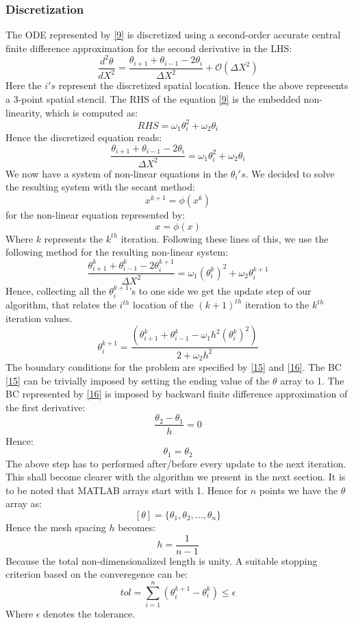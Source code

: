 \documentclass[12pt]{article}
\begin{document}
\subsubsection{Discretization}
The ODE represented by \eqref{9} is discretized using a second-order accurate central finite difference approximation for the second derivative in the LHS: 
\[
\frac{d^2\theta}{dX^2} = \frac{\theta_{i+1}+\theta_{i-1}-2\theta_i}{\Delta X^2} + \mathcal{O}(\Delta X^2) \tag{27} \label{27}
\]
Here the $i's$ represent the discretized spatial location.  Hence the above represents a 3-point spatial stencil. The RHS of the equation \eqref{9} is the embedded non-linearity, which is computed as:
\[
RHS = \omega_1 \theta_i^2 + \omega_2 \theta_i \tag{28} \label{28}
\]
Hence the discretized equation reads:
\[
 \frac{\theta_{i+1}+\theta_{i-1}-2\theta_i}{\Delta X^2} = \omega_1 \theta_i^2 + \omega_2 \theta_i \tag{29} \label{29}
\]
We now have a system of non-linear equations in the $\theta_i's$. We decided to solve the resulting system with the secant method: 
\[
x^{k+1} = \phi (x^k) \tag{30} \label{30}
\]
for the non-linear equation represented by:
\[
x = \phi (x) \tag{31} \label{31}
\]
Where $k$ represents the $k^{th}$ iteration. Following these lines of this, we use the following method for the resulting non-linear system: 
\[
\frac{\theta_{i+1}^k+\theta_{i-1}^k-2\theta_i^{k+1}}{\Delta X^2} = \omega_1 (\theta_i^k)^2 + \omega_2 \theta_i^{k+1} \tag{32} \label{32}
\]
Hence, collecting all the $\theta_i^{k+1}$'s to one side we get the update step of our algorithm, that relates the $i^{th}$ location of the $(k+1)^{th}$ iteration to the $k^{th}$ iteration values. 
\[
\theta_i^{k+1} = \frac{(\theta_{i+1}^k+\theta_{i-1}^k-\omega_1 h^2 (\theta_{i}^k)^2)}{2+\omega_2 h^2} \tag{33} \label{33}
\]
The boundary conditions for the problem are specified by \eqref{15} and \eqref{16}. The BC \eqref{15} can be trivially imposed by setting the ending value of the $\theta$ array to 1. The BC represented by \eqref{16} is imposed by backward finite difference approximation of the first derivative:
\[
\frac{\theta_2-\theta_1}{h} = 0 \label{34} \tag{34}
\]
Hence: 
\[
\theta_1 = \theta_2 \label{35} \tag{35}
\]
The above step has to performed after/before every update to the next iteration. This shall become clearer with the algorithm we present in the next section. It is to be noted that MATLAB arrays start with 1. Hence for $n$ points we have the $\theta$ array as: 
\[
[\theta] = \{\theta_1, \theta_2,...,\theta_n\} \tag{36} \label{36}
\]
Hence the mesh spacing $h$ becomes: 
\[
h = \frac{1}{n-1} \tag{37} \label{37}
\]
Because the total non-dimensionalized length is unity. A suitable stopping criterion based on the converegence can be:
\[
tol = \sum_{i=1}^n (\theta_i^{k+1} - \theta_i^k) \leq \epsilon \tag{38} \label{38}
\]
Where $\epsilon$ denotes the tolerance. 
\end{document}

